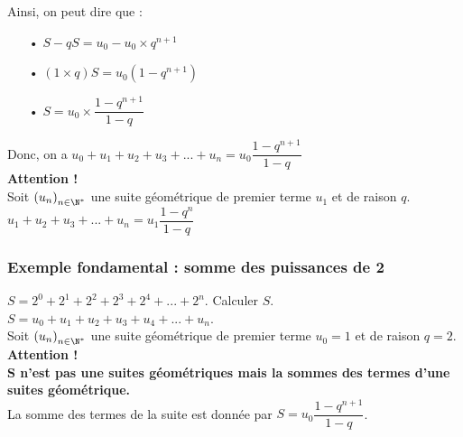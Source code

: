 \vspace*{.3cm}

Ainsi, on peut dire que : \\

\begin{itemize}
\item[•]$ S - qS = u_0 - u_0 \times q^{n+1}$ \\
\item[•] $\left(1 \times q\right)S = u_0 \left(1 - q^{n+1}\right)$ \\
\item[•] $S = u_0 \times \dfrac{1 - q^{n+1}}{1 - q}$ \\
\end{itemize}

\vspace*{.3cm}

Donc, on a $u_0 + u_1 + u_2 + u_3 + ... + u_n = u_0 \dfrac{1 - q^{n+1}}{1 - q}$ \\

\textbf{Attention !} \\

Soit $\left(u_n\right)_{n\in \N^*}$ une suite géométrique de premier terme $u_1$ et de raison $q$. \\

$u_1 + u_2 + u_3 + ... + u_n = u_1 \dfrac{1 - q^n}{1 - q}$

\newpage

\vspace*{-1.5cm}

\subsubsection{Exemple fondamental : somme des puissances de 2}

$S = 2^0 + 2^1 + 2^2 + 2^3 + 2^4 + ... + 2^n$. Calculer $S$. \\

$S = u_0 + u_1 + u_2 + u_3 + u_4 + ... + u_n$. \\

Soit $\left(u_n\right)_{n \in \N^*}$ une suite géométrique de premier terme $u_0 = 1$ et de raison $q = 2$. \\

\textbf{Attention !}  \\

\textbf{$\mathbf{S}$ n'est pas une suites géométriques mais la sommes des termes d'une suites géométrique.} \\

La somme des termes de la suite est donnée par $S = u_0\dfrac{1 - q^{n+1}}{1 - q}$. \\

